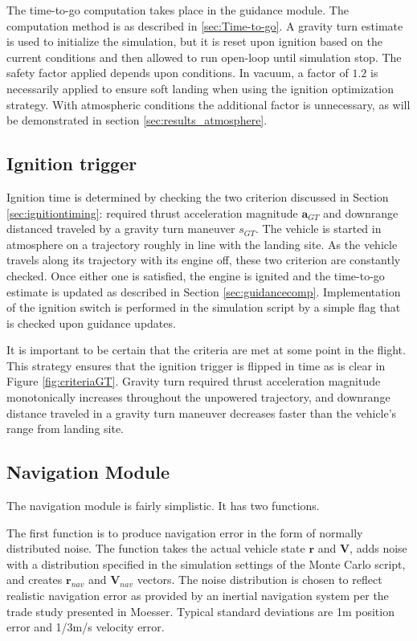 The time-to-go computation takes place in the guidance module. The computation method is as described in \ref{sec:Time-to-go}. A gravity turn estimate is used to initialize the simulation, but it is reset upon ignition based on the current conditions and then allowed to run open-loop until simulation stop. The safety factor applied depends upon conditions. In vacuum, a factor of $1.2$ is necessarily applied to ensure soft landing when using the ignition optimization strategy. With atmospheric conditions the additional factor is unnecessary, as will be demonstrated in section \ref{sec:results_atmosphere}.

\subsection{Ignition trigger}
Ignition time is determined by checking the two criterion discussed in Section \ref{sec:ignitiontiming}: required thrust acceleration magnitude $\bm{a}_{GT}$ and downrange distanced traveled by a gravity turn maneuver $s_{GT}$. The vehicle is started in atmosphere on a trajectory roughly in line with the landing site. As the vehicle travels along its trajectory with its engine off, these two criterion are constantly checked. Once either one is satisfied, the engine is ignited and the time-to-go estimate is updated as described in Section \ref{sec:guidancecomp}. Implementation of the ignition switch is performed in the simulation script by a simple flag that is checked upon guidance updates.

It is important to be certain that the criteria are met at some point in the flight. This strategy ensures that the ignition trigger is flipped in time as is clear in Figure \ref{fig:criteriaGT}. Gravity turn required thrust acceleration magnitude monotonically increases throughout the unpowered trajectory, and downrange distance traveled in a gravity turn maneuver decreases faster than the vehicle's range from landing site.

\subsection{Navigation Module} \label{sec:navmod}
The navigation module is fairly simplistic. It has two functions. 

The first function is to produce navigation error in the form of normally distributed noise. The function takes the actual vehicle state $\bm{r}$ and $\bm{V}$, adds noise with a distribution specified in the simulation settings of the Monte Carlo script, and creates $\bm{r}_{nav}$ and $\bm{V}_{nav}$ vectors. The noise distribution is chosen to reflect realistic navigation error as provided by an inertial navigation system per the trade study presented in Moesser\:\cite{MOESSER}. Typical standard deviations are 1\:m position error and 1/3\:m/s velocity error.

